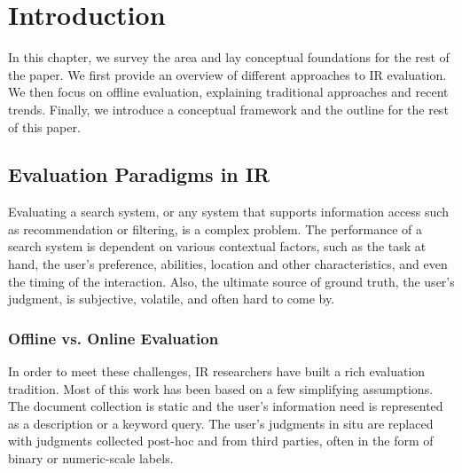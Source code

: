 \documentclass[openany]{now} %
\newcommand{\authornote}[3]{\marginpar{\tiny\color{#1}#2: #3}{\color{#1}{$\star$}}}
\newcommand{\emine}[1]{\authornote{green}{Emine}{#1}}
\newcommand{\paul}[1]{\authornote{blue}{Paul}{#1}}
\begin{document}
\begin{abstract}
\end{abstract}


\chapter{Introduction}
\label{c-intro}

In this chapter, we survey the area and lay conceptual foundations for the rest of the paper. We first provide an overview of different approaches to IR evaluation. We then focus on offline evaluation, explaining traditional approaches and recent trends. Finally, we introduce a conceptual framework and the outline for the rest of this paper.

\section{Evaluation Paradigms in IR}
\label{sec:evaluation-paradigms}

Evaluating a search system, or any system that supports information access such as recommendation or filtering, is a complex problem. The performance of a search system is dependent on various contextual factors, such as the task at hand, the user's preference, abilities, location and other characteristics, and even the timing of the interaction. Also, the ultimate source of ground truth, the user's judgment, is subjective, volatile, and often hard to come by.

\subsection{Offline vs. Online Evaluation}

In order to meet these challenges, IR researchers have built a rich evaluation tradition. Most of this work has been based on a few simplifying assumptions. The document collection is static and the user's information need is represented as a description or a keyword query. The user's judgments in situ are replaced with judgments collected post-hoc and from third parties, often in the form of binary or numeric-scale labels.
\end{document}
